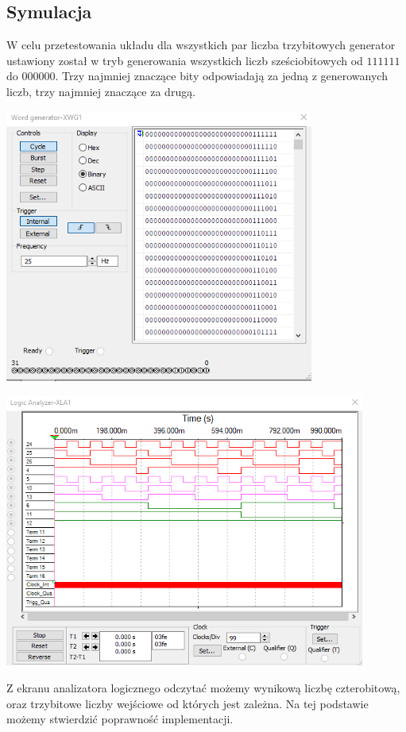 \documentclass{article}
\begin{document}
        \subsection{Symulacja}
            W celu przetestowania układu dla wszystkich par liczba trzybitowych generator ustawiony został w tryb generowania wszystkich liczb sześciobitowych od $111111$ do $000000$. Trzy najmniej znaczące bity odpowiadają za jedną z generowanych liczb, trzy najmniej znaczące za drugą.   
            \begin{center}
                \includegraphics[height=9cm]{reports/img/Z1A_gen.png}\\
            \end{center}
            \begin{center}
                \includegraphics[height=9cm]{reports/img/Z1A_analize.png}\\
            \end{center}
            Z ekranu analizatora logicznego odczytać możemy wynikową liczbę czterobitową, oraz trzybitowe liczby wejściowe od których jest zależna. Na tej podstawie możemy stwierdzić poprawność implementacji.
\end{document}
